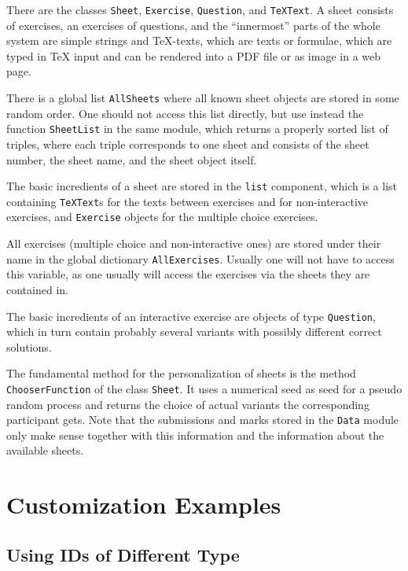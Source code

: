 \documentclass[12pt,openany,a4paper]{book}
\begin{document}
There are the classes \texttt{Sheet}, \texttt{Exercise},
\texttt{Question}, and \texttt{TeXText}. A sheet consists of exercises,
an exercises of questions, and the ``innermost'' parts of the whole
system are simple strings and \TeX-texts, which are texts or formulae, which
are typed in {\TeX} input and can be rendered into a PDF file or as
image in a web page.

There is a global list \texttt{AllSheets} where all known sheet
objects are stored in some random order. One should not access this list
directly, but use instead the function \texttt{SheetList} in the same
module, which returns a properly sorted list of triples, where each triple
corresponds to one sheet and consists of the sheet number, the sheet name,
and the sheet object itself.

The basic incredients of a sheet are stored in the \texttt{list} component,
which is a list containing \texttt{TeXText}s for the texts between
exercises and for non-interactive exercises, and \texttt{Exercise} objects
for the multiple choice exercises.

All exercises (multiple choice and non-interactive ones) are stored under
their name in the global dictionary \texttt{AllExercises}. Usually one
will not have to access this variable, as one usually will access the
exercises via the sheets they are contained in.

The basic incredients of an interactive exercise are objects of type
\texttt{Question}, which in turn contain probably several variants
with possibly different correct solutions.

The fundamental method for the personalization of sheets is the method
\texttt{ChooserFunction} of the class \texttt{Sheet}. It uses a numerical
seed as seed for a pseudo random process and returns the choice of actual
variants the corresponding participant gets. Note that the submissions and
marks stored in the \texttt{Data} module only make sense together with this
information and the information about the available sheets.

\appendix
\chapter{Customization Examples}
\section{Using IDs of Different Type}
\end{document}
